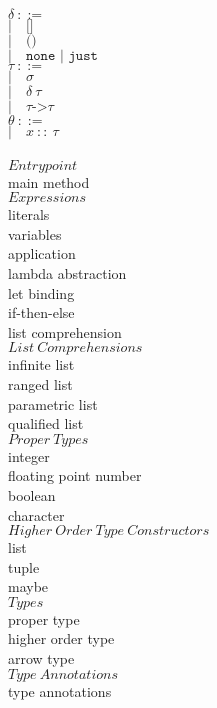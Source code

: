\documentclass[5pt]{article}
\begin{document}
\begin{multicols}{2}
\noindent $\delta \ ::= $ \\
\hspace*{10mm} $| \quad \texttt{[]} $ \\
\hspace*{10mm} $| \quad \texttt{()} $ \\
\hspace*{10mm} $| \quad \texttt{none | just} $ \\

\noindent $\tau \ ::= $ \\
\hspace*{10mm} $| \quad \sigma $ \\
\hspace*{10mm} $| \quad \delta \ \tau $ \\
\hspace*{10mm} $| \quad \tau \texttt{->} \tau $ \\

\noindent $\theta \ ::= $ \\
\hspace*{10mm} $| \quad x \ :: \  \tau $ \\
\columnbreak \\
$Entrypoint$ \\
main method \\

\noindent $Expressions$ \\
literals \\
variables \\
application \\
lambda abstraction \\
let binding \\
if-then-else \\
list comprehension \\

\noindent $List \ Comprehensions$ \\
infinite list \\
ranged list \\
parametric list \\
qualified list \\

\noindent $Proper \ Types$ \\
integer \\
floating point number \\
boolean \\
character \\

\noindent $Higher \ Order \ Type \ Constructors$ \\
list \\
tuple \\
maybe \\

\noindent $Types$ \\
proper type \\
higher order type \\
arrow type \\

\noindent $Type \ Annotations$ \\
type annotations \\
\end{multicols}
\end{document}

